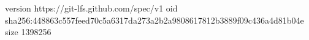 version https://git-lfs.github.com/spec/v1
oid sha256:448863c557feed70c5a6317da273a2b2a9808617812b3889f09c436a4d81b04e
size 1398256
